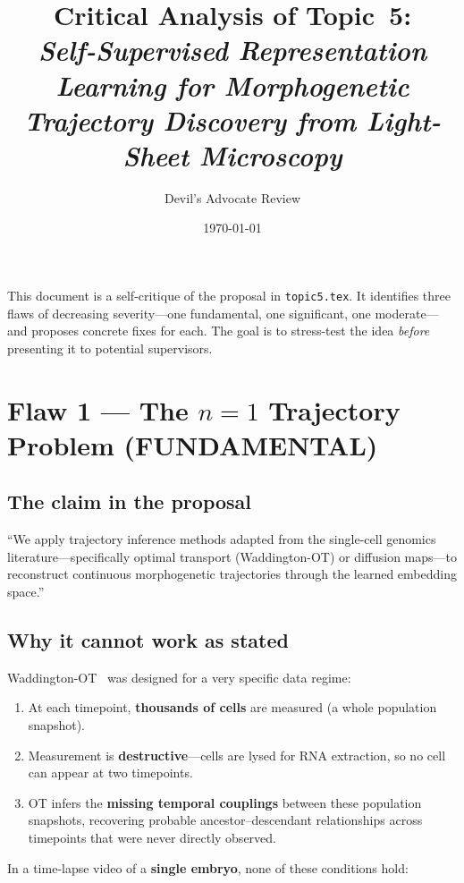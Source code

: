 \documentclass{article}
\title{Critical Analysis of Topic~5:\\
\textit{Self-Supervised Representation Learning for Morphogenetic Trajectory Discovery from Light-Sheet Microscopy}}
\author{Devil's Advocate Review}
\date{\today}
\begin{document}
\maketitle

\noindent This document is a self-critique of the proposal in \texttt{topic5.tex}. It
identifies three flaws of decreasing severity---one fundamental, one significant,
one moderate---and proposes concrete fixes for each. The goal is to stress-test
the idea \emph{before} presenting it to potential supervisors.

\section{Flaw 1 --- The $n{=}1$ Trajectory Problem (FUNDAMENTAL)}

\subsection*{The claim in the proposal}
``We apply trajectory inference methods adapted from the single-cell genomics
literature---specifically optimal transport (Waddington-OT) or diffusion
maps---to reconstruct continuous morphogenetic trajectories through the learned
embedding space.''

\subsection*{Why it cannot work as stated}
Waddington-OT~\cite{wot} was designed for a very specific data regime:

\begin{enumerate}
	\item At each timepoint, \textbf{thousands of cells} are measured (a whole
	      population snapshot).
	\item Measurement is \textbf{destructive}---cells are lysed for RNA
	      extraction, so no cell can appear at two timepoints.
	\item OT infers the \textbf{missing temporal couplings} between these
	      population snapshots, recovering probable ancestor--descendant
	      relationships across timepoints that were never directly observed.
\end{enumerate}

\noindent In a time-lapse video of a \textbf{single embryo}, none of these
conditions hold:
\end{document}
